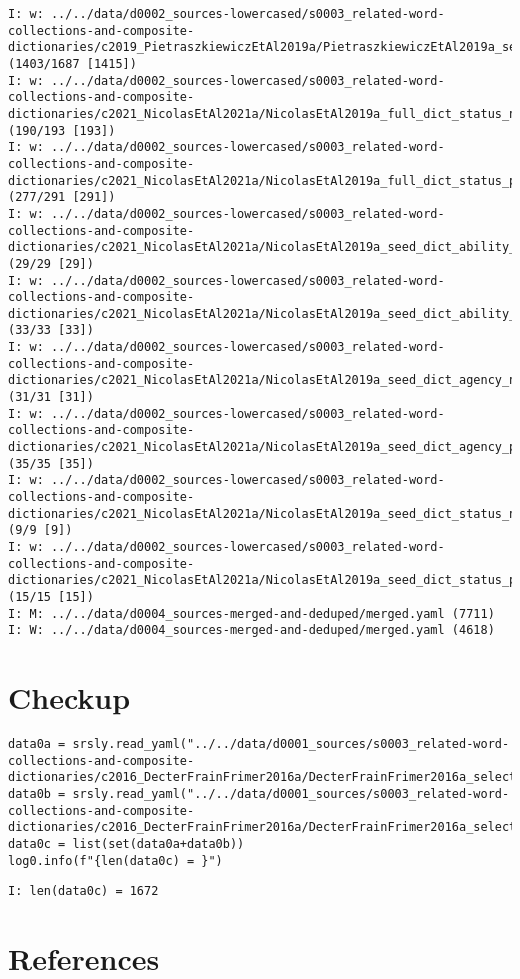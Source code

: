 \documentclass[a4paper,10pt,onecolumn,oneside,openright]{article}
\begin{document}
\begin{verbatim}
I: w: ../../data/d0002_sources-lowercased/s0003_related-word-collections-and-composite-dictionaries/c2019_PietraszkiewiczEtAl2019a/PietraszkiewiczEtAl2019a_selected_liwc_cats.yaml (1403/1687 [1415])
I: w: ../../data/d0002_sources-lowercased/s0003_related-word-collections-and-composite-dictionaries/c2021_NicolasEtAl2021a/NicolasEtAl2019a_full_dict_status_negat.yaml (190/193 [193])
I: w: ../../data/d0002_sources-lowercased/s0003_related-word-collections-and-composite-dictionaries/c2021_NicolasEtAl2021a/NicolasEtAl2019a_full_dict_status_posit.yaml (277/291 [291])
I: w: ../../data/d0002_sources-lowercased/s0003_related-word-collections-and-composite-dictionaries/c2021_NicolasEtAl2021a/NicolasEtAl2019a_seed_dict_ability_negat.yaml (29/29 [29])
I: w: ../../data/d0002_sources-lowercased/s0003_related-word-collections-and-composite-dictionaries/c2021_NicolasEtAl2021a/NicolasEtAl2019a_seed_dict_ability_posit.yaml (33/33 [33])
I: w: ../../data/d0002_sources-lowercased/s0003_related-word-collections-and-composite-dictionaries/c2021_NicolasEtAl2021a/NicolasEtAl2019a_seed_dict_agency_negat.yaml (31/31 [31])
I: w: ../../data/d0002_sources-lowercased/s0003_related-word-collections-and-composite-dictionaries/c2021_NicolasEtAl2021a/NicolasEtAl2019a_seed_dict_agency_posit.yaml (35/35 [35])
I: w: ../../data/d0002_sources-lowercased/s0003_related-word-collections-and-composite-dictionaries/c2021_NicolasEtAl2021a/NicolasEtAl2019a_seed_dict_status_negat.yaml (9/9 [9])
I: w: ../../data/d0002_sources-lowercased/s0003_related-word-collections-and-composite-dictionaries/c2021_NicolasEtAl2021a/NicolasEtAl2019a_seed_dict_status_posit.yaml (15/15 [15])
I: M: ../../data/d0004_sources-merged-and-deduped/merged.yaml (7711)
I: W: ../../data/d0004_sources-merged-and-deduped/merged.yaml (4618)
\end{verbatim}
\section{Checkup}
\label{sec:orgbe82851}
\begin{verbatim}
data0a = srsly.read_yaml("../../data/d0001_sources/s0003_related-word-collections-and-composite-dictionaries/c2016_DecterFrainFrimer2016a/DecterFrainFrimer2016a_selected_liwc_cats_agency_posit.yaml")
data0b = srsly.read_yaml("../../data/d0001_sources/s0003_related-word-collections-and-composite-dictionaries/c2016_DecterFrainFrimer2016a/DecterFrainFrimer2016a_selected_liwc_cats_agency_negat.yaml")
data0c = list(set(data0a+data0b))
log0.info(f"{len(data0c) = }")
\end{verbatim}

\begin{verbatim}
I: len(data0c) = 1672
\end{verbatim}

\section*{References}
\label{sec:org7c2a15d}

\printbibliography[heading=none]
\end{document}
